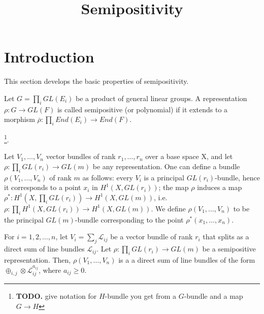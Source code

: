 


\newcommand{\todo}[1]{\footnote{\textbf{TODO.} #1}}


\title{Semipositivity}
\maketitle

\section{Introduction}
This section develops the basic properties of semipositivity.


\begin{definition}
Let $G=\prod_i GL(E_i)$ be a product of general linear groups. A representation $\rho:G\rightarrow GL(F)$ is called semipositive (or polynomial) if it extends to a morphism $\overline{\rho}:\prod_i End(E_i)\rightarrow End(F)$.
\end{definition}

\todo{give notation for $H$-bundle you get from a $G$-bundle and a map $G\to H$}.

\begin{definition}
Let $V_1,\dots, V_n$ vector bundles of rank $r_1,\dots, r_n$ over a base space X, and let $\rho:\prod_i GL(r_i)\rightarrow GL(m)$ be any representation. One can define a bundle $\rho(V_1,\dots, V_n)$ of rank $m$ as follows: every $V_i$ is a principal $GL(r_i)$-bundle, hence it corresponds to a point $x_i$ in $H^1(X, GL(r_i))$; the map $\rho$ induces a map $\rho^*:H^1(X,\prod_i GL(r_i))\rightarrow H^1(X, GL(m))$, i.e. $\rho: \prod_i H^1(X,GL(r_i))\rightarrow H^1(X, GL(m))$. We define $\rho(V_1,\dots, V_n)$ to be the principal $GL(m)$-bundle corresponding to the point $\rho^*(x_1,\dots,x_n)$.
\end{definition}

\begin{lemma}
For $i=1,2,\ldots,n$, let $V_i=\sum_{j}\mathcal{L}_{ij}$ be a vector bundle of rank $r_i$ that splits as a direct sum of line bundles $\mathcal{L}_{ij}$. Let $\rho:\prod_{i}GL(r_i)\to GL(m)$ be a semipositive representation. Then, $\rho(V_1,\ldots,V_n)$ is a a direct sum of line bundles of the form $\oplus_{i,j}\otimes\mathcal{L}_{ij}^{a_{ij}}$, where $a_{ij}\ge0$.
\end{lemma}

